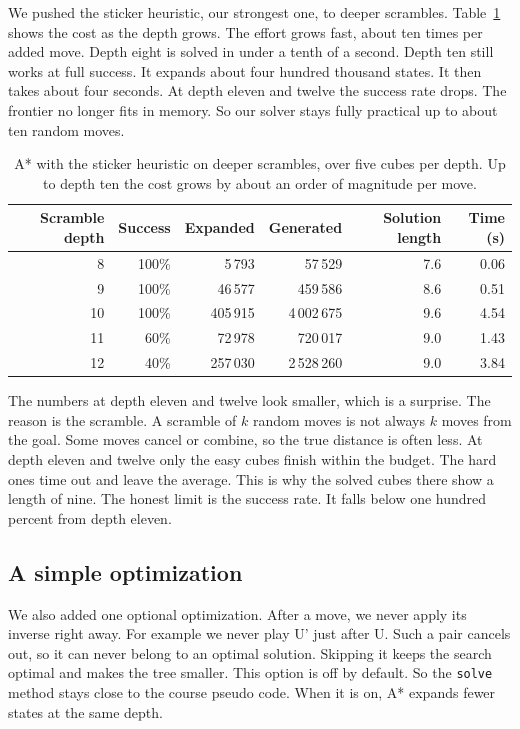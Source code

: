 \documentclass[11pt,a4paper]{article}
\begin{document}
We pushed the sticker heuristic, our strongest one, to deeper scrambles.
Table~\ref{tab:deep} shows the cost as the depth grows. The effort grows fast,
about ten times per added move. Depth eight is solved in under a tenth of a second.
Depth ten still works at full success. It expands about four hundred thousand
states. It then takes about four seconds. At depth eleven and twelve the success
rate drops. The frontier no longer fits in memory. So our solver stays fully
practical up to about ten random moves.

\begin{table}[H]
\centering
\small
\begin{tabular}{rrrrrr}
\toprule
Scramble depth & Success & Expanded & Generated & Solution length & Time (s) \\
\midrule
8  & 100\% & 5\,793    & 57\,529    & 7.6 & 0.06 \\
9  & 100\% & 46\,577   & 459\,586   & 8.6 & 0.51 \\
10 & 100\% & 405\,915  & 4\,002\,675 & 9.6 & 4.54 \\
11 & 60\%  & 72\,978   & 720\,017   & 9.0 & 1.43 \\
12 & 40\%  & 257\,030  & 2\,528\,260 & 9.0 & 3.84 \\
\bottomrule
\end{tabular}
\caption{A* with the sticker heuristic on deeper scrambles, over five cubes per
depth. Up to depth ten the cost grows by about an order of magnitude per move.}
\label{tab:deep}
\end{table}

The numbers at depth eleven and twelve look smaller, which is a surprise. The
reason is the scramble. A scramble of $k$ random moves is not always $k$ moves from
the goal. Some moves cancel or combine, so the true distance is often less. At
depth eleven and twelve only the easy cubes finish within the budget. The hard ones
time out and leave the average. This is why the solved cubes there show a length of
nine. The honest limit is the success rate. It falls below one hundred percent from
depth eleven.

\subsection{A simple optimization}

We also added one optional optimization. After a move, we never apply its inverse
right away. For example we never play U' just after U. Such a pair cancels out, so
it can never belong to an optimal solution. Skipping it keeps the search optimal
and makes the tree smaller. This option is off by default. So the \texttt{solve}
method stays close to the course pseudo code. When it is on, A* expands fewer
states at the same depth.
\end{document}
